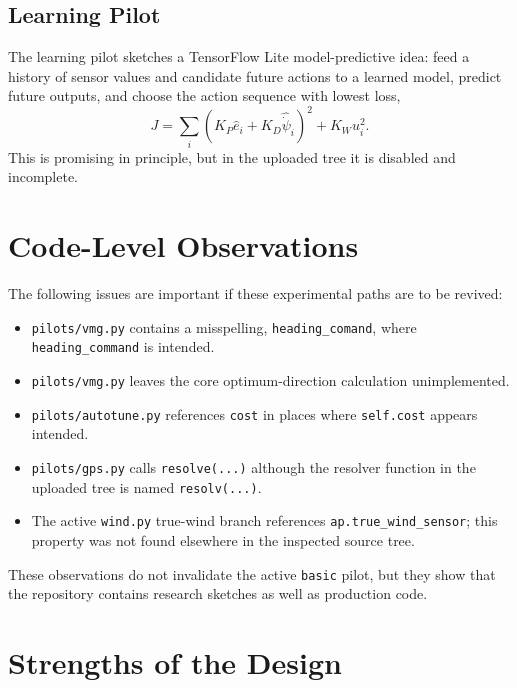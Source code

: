 \documentclass[11pt,twocolumn]{article}
\newcommand{\heading}{\psi}
\begin{document}
\subsection{Learning Pilot}

The learning pilot sketches a TensorFlow Lite model-predictive idea: feed a history of
sensor values and candidate future actions to a learned model, predict future outputs, and
choose the action sequence with lowest loss,
\begin{equation}
  J = \sum_i
  \left(K_P \hat e_i + K_D\widehat{\dot{\heading}}_i\right)^2
  + K_W u_i^2.
\end{equation}
This is promising in principle, but in the uploaded tree it is disabled and incomplete.

\section{Code-Level Observations}

The following issues are important if these experimental paths are to be revived:
\begin{itemize}
\item \texttt{pilots/vmg.py} contains a misspelling, \texttt{heading\_comand}, where
\texttt{heading\_command} is intended.
\item \texttt{pilots/vmg.py} leaves the core optimum-direction calculation unimplemented.
\item \texttt{pilots/autotune.py} references \texttt{cost} in places where
\texttt{self.cost} appears intended.
\item \texttt{pilots/gps.py} calls \texttt{resolve(...)} although the resolver function
in the uploaded tree is named \texttt{resolv(...)}.
\item The active \texttt{wind.py} true-wind branch references \texttt{ap.true\_wind\_sensor};
this property was not found elsewhere in the inspected source tree.
\end{itemize}

These observations do not invalidate the active \texttt{basic} pilot, but they show that
the repository contains research sketches as well as production code.

\section{Strengths of the Design}
\end{document}
